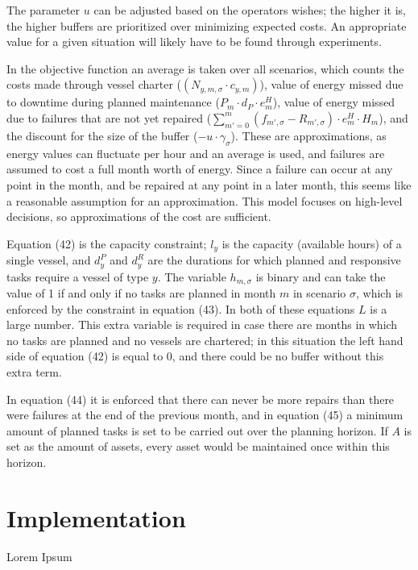 \documentclass[a4paper,12pt]{article}
\begin{document}
The parameter $u$ can be adjusted based on the operators wishes; the higher it is, the higher buffers are prioritized over minimizing expected costs. An appropriate value for a given situation will likely have to be found through experiments. 

In the objective function an average is taken over all scenarios, which counts the costs made through vessel charter ($(N_{y,m,\sigma} \cdot c_{y,m})$), value of energy missed due to downtime during planned maintenance ($P_m \cdot d_P \cdot e^H_m$), value of energy missed due to failures that are not yet repaired ($\sum_{m' = 0}^{m} (f_{m',\sigma} - R_{m',\sigma}) \cdot e^H_m \cdot H_m$), and the discount for the size of the buffer ($- u \cdot \gamma_\sigma$). These are approximations, as energy values can fluctuate per hour and an average is used, and failures are assumed to cost a full month worth of energy. Since a failure can occur at any point in the month, and be repaired at any point in a later month, this seems like a reasonable assumption for an approximation. This model focuses on high-level decisions, so approximations of the cost are sufficient. 

Equation (42) is the capacity constraint; $l_y$ is the capacity (available hours) of a single vessel, and $d^P_y$ and $d^R_y$ are the durations for which planned and responsive tasks require a vessel of type $y$. The variable $h_{m,\sigma}$ is binary and can take the value of 1 if and only if no tasks are planned in month $m$ in scenario $\sigma$, which is enforced by the constraint in equation (43). In both of these equations $L$ is a large number. This extra variable is required in case there are months in which no tasks are planned and no vessels are chartered; in this situation the left hand side of equation (42) is equal to 0, and there could be no buffer without this extra term.

In equation (44) it is enforced that there can never be more repairs than there were failures at the end of the previous month, and in equation (45) a minimum amount of planned tasks is set to be carried out over the planning horizon. If $A$ is set as the amount of assets, every asset would be maintained once within this horizon. 

\pagebreak

\section{Implementation}\label{s:impl}
Lorem Ipsum 
\end{document}
